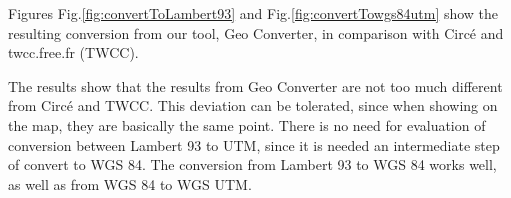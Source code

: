 Figures Fig.\ref{fig:convertToLambert93} and Fig.\ref{fig:convertTowgs84utm} show the resulting conversion from our tool, Geo Converter, in comparison with Circ\'e and twcc.free.fr (TWCC).


\begin{figure}[ht!]
\end{figure}


\begin{figure}[ht!]
\end{figure}

 The results show that the results from Geo Converter are not too much different from Circ\'e and TWCC. This deviation can be tolerated, since when showing on the map, they are basically the same point.
There is no need for evaluation of conversion between Lambert 93 to UTM, since it is needed an intermediate step of convert to WGS 84. The conversion from Lambert 93 to WGS 84 works well, as well as from WGS 84 to WGS UTM.

